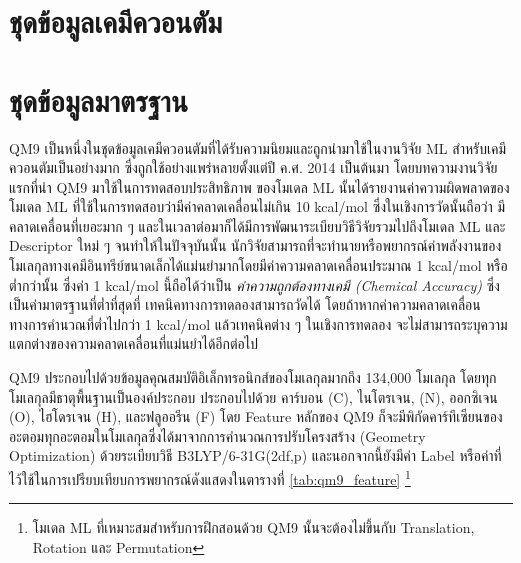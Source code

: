 \section{ชุดข้อมูลเคมีควอนตัม}
\label{ssec:step_create_qm_dataset}

\section{ชุดข้อมูลมาตรฐาน}
\label{sec:std_dataset}

QM9 เป็นหนึ่งในชุดข้อมูลเคมีควอนตัมที่ได้รับความนิยมและถูกนำมาใช้ในงานวิจัย ML สำหรับเคมีควอนตัมเป็นอย่างมาก ซึ่งถูกใช้อย่างแพร่หลายตั้งแต่ปี 
ค.ศ. 2014 เป็นต้นมา\autocite{ruddigkeit2012,ramakrishnan2014} โดยบทความงานวิจัยแรกที่นำ QM9 มาใช้ในการทดสอบประสิทธิภาพ%
ของโมเดล ML นั้นได้รายงานค่าความผิดพลาดของโมเดล ML ที่ใช้ในการทดสอบว่ามีค่าคลาดเคลื่อนไม่เกิน 10 kcal/mol ซึ่งในเชิงการวัดนั้นถือว่า%
มีคลาดเคลื่อนที่เยอะมาก ๆ และในเวลาต่อมาก็ได้มีการพัฒนาระเบียบวิธีวิจัยรวมไปถึงโมเดล ML และ Descriptor ใหม่ ๆ จนทำให้ในปัจจุบันนั้น%
นักวิจัยสามารถที่จะทำนายหรือพยากรณ์ค่าพลังงานของโมเลกุลทางเคมีอินทรีย์ขนาดเล็กได้แม่นยำมากโดยมีค่าความคลาดเคลื่อนประมาณ 1 kcal/mol 
หรือต่ำกว่านั้น ซึ่งค่า 1 kcal/mol นี้ถือได้ว่าเป็น \textit{ค่าความถูกต้องทางเคมี (Chemical Accuracy)} ซึ่งเป็นค่ามาตรฐานที่ต่ำที่สุดที่%
เทคนิคทางการทดลองสามารถวัดได้ โดยถ้าหากค่าความคลาดเคลื่อนทางการคำนวณที่ต่ำไปกว่า 1 kcal/mol แล้วเทคนิคต่าง ๆ ในเชิงการทดลอง%
จะไม่สามารถระบุความแตกต่างของความคลาดเคลื่อนที่แม่นยำได้อีกต่อไป

QM9 ประกอบไปด้วยข้อมูลคุณสมบัติอิเล็กทรอนิกส์ของโมเลกุลมากถึง 134,000 โมเลกุล โดยทุกโมเลกุลมีธาตุพื้นฐานเป็นองค์ประกอบ ประกอบไปด้วย 
คาร์บอน (C), ไนโตรเจน, (N), ออกซิเจน (O), ไฮโดรเจน (H), และฟลูออรีน (F) โดย Feature หลักของ QM9 ก็จะมีพิกัดคาร์ทีเซียนของ%
อะตอมทุกอะตอมในโมเลกุลซึ่งได้มาจากการคำนวณการปรับโครงสร้าง (Geometry Optimization) ด้วยระเบียบวิธี B3LYP/6-31G(2df,p) 
และนอกจากนี้ยังมีค่า Label หรือค่าที่ไว้ใช้ในการเปรียบเทียบการพยากรณ์ดังแสดงในตารางที่ \ref{tab:qm9_feature}%
\footnote{โมเดล ML ที่เหมาะสมสำหรับการฝึกสอนด้วย QM9 นั้นจะต้องไม่ขึ้นกับ Translation, Rotation และ Permutation}

